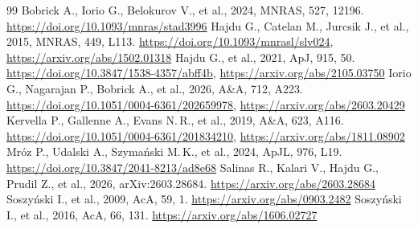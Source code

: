 \documentclass[11pt]{article}
\begin{document}
\begin{thebibliography}{99}\small
{} Bobrick A., Iorio G., Belokurov V., et al., 2024, MNRAS, 527, 12196.
\url{https://doi.org/10.1093/mnras/stad3996}
 Hajdu G., Catelan M., Jurcsik J., et al., 2015, MNRAS, 449, L113.
\url{https://doi.org/10.1093/mnrasl/slv024}, \url{https://arxiv.org/abs/1502.01318}
 Hajdu G., et al., 2021, ApJ, 915, 50. \url{https://doi.org/10.3847/1538-4357/abff4b},
\url{https://arxiv.org/abs/2105.03750}
 Iorio G., Nagarajan P., Bobrick A., et al., 2026, A\&A, 712, A223.
\url{https://doi.org/10.1051/0004-6361/202659978}, \url{https://arxiv.org/abs/2603.20429}
 Kervella P., Gallenne A., Evans N.\,R., et al., 2019, A\&A, 623, A116.
\url{https://doi.org/10.1051/0004-6361/201834210}, \url{https://arxiv.org/abs/1811.08902}
 Mr\'oz P., Udalski A., Szyma\'nski M.\,K., et al., 2024, ApJL, 976, L19.
\url{https://doi.org/10.3847/2041-8213/ad8e68}
 Salinas R., Kalari V., Hajdu G., Prudil Z., et al., 2026, arXiv:2603.28684.
\url{https://arxiv.org/abs/2603.28684}
 Soszy\'nski I., et al., 2009, AcA, 59, 1. \url{https://arxiv.org/abs/0903.2482}
 Soszy\'nski I., et al., 2016, AcA, 66, 131. \url{https://arxiv.org/abs/1606.02727}
\end{thebibliography}
\end{document}
